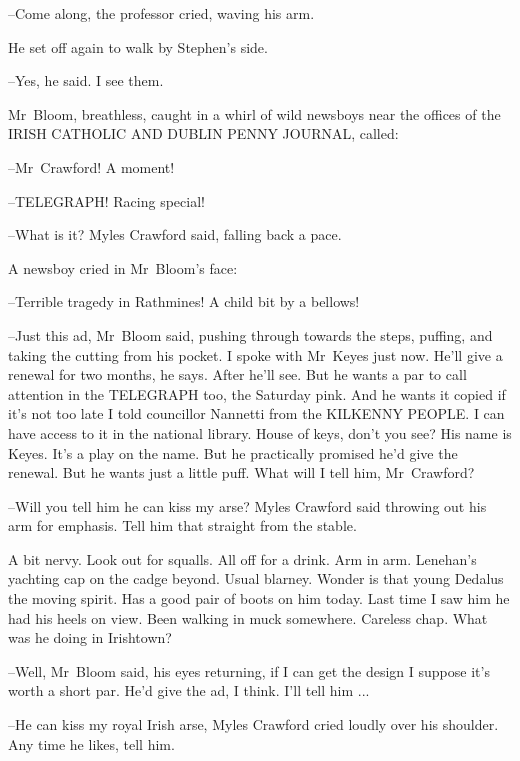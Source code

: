 --Come along,
the professor cried,
waving his arm.

He set off again to walk by Stephen's side.



--Yes,
he said.
I see them.

Mr~Bloom,
breathless,
caught in a whirl of wild newsboys
near the offices of the IRISH CATHOLIC AND DUBLIN PENNY JOURNAL,
called:

--Mr~Crawford!
A moment!

--TELEGRAPH!
Racing special!

--What is it?
Myles Crawford said,
falling back a pace.

A newsboy cried in Mr~Bloom's face:

--Terrible tragedy in Rathmines!
A child bit by a bellows!



--Just this ad,
Mr~Bloom said,
pushing through towards the steps,
puffing,
and taking the cutting from his pocket.
I spoke with Mr~Keyes just now.
He'll give a renewal for two months, he says.
After he'll see.
But he wants a par to call attention in the TELEGRAPH too,
the Saturday pink.
And he wants it copied if it's not too late
I told councillor Nannetti from the KILKENNY PEOPLE.
I can have access to it in the national library.
House of keys, don't you see?
His name is Keyes.
It's a play on the name.
But he practically promised he'd give the renewal.
But he wants
just a little puff.
What will I tell him, Mr~Crawford?



--Will you tell him he can kiss my arse?
Myles Crawford said
throwing out his arm for emphasis.
Tell him that straight from the stable.

A bit nervy.
Look out for squalls.
All off for a drink.
Arm in arm.
Lenehan's yachting cap on the cadge beyond.
Usual blarney.
Wonder is that young Dedalus the moving spirit.
Has a good pair of boots on him today.
Last time I saw him he had his heels on view.
Been walking in muck somewhere.
Careless chap.
What was he doing in Irishtown?

--Well,
Mr~Bloom said,
his eyes returning,
if I can get the design
I suppose it's worth a short par.
He'd give the ad, I think.
I'll tell him ...



--He can kiss my royal Irish arse,
Myles Crawford cried loudly over his shoulder.
Any time he likes, tell him.


